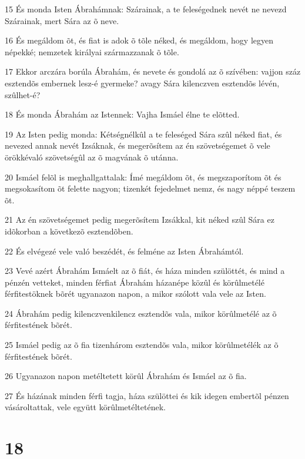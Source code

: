 \par 15 És monda Isten Ábrahámnak: Szárainak, a te feleségednek nevét ne nevezd Szárainak, mert Sára az õ neve.
\par 16 És megáldom õt, és fiat is adok õ tõle néked, és megáldom, hogy legyen népekké; nemzetek királyai származzanak õ tõle.
\par 17 Ekkor arczára borúla Ábrahám, és nevete és gondolá az õ szívében: vajjon száz esztendõs embernek lesz-é gyermeke? avagy Sára kilenczven esztendõs lévén, szûlhet-é?
\par 18 És monda Ábrahám az Istennek: Vajha Ismáel élne te elõtted.
\par 19 Az Isten pedig monda: Kétségnélkûl a te feleséged Sára szûl néked fiat, és nevezed annak nevét Izsáknak, és megerõsítem az én szövetségemet õ vele örökkévaló szövetségûl az õ magvának õ utánna.
\par 20 Ismáel felõl is meghallgattalak: Ímé megáldom õt, és megszaporítom õt és megsokasítom õt felette nagyon; tizenkét fejedelmet nemz, és nagy néppé teszem õt.
\par 21 Az én szövetségemet pedig megerõsítem Izsákkal, kit néked szûl Sára ez idõkorban a következõ esztendõben.
\par 22 És elvégezé vele való beszédét, és felméne az Isten Ábrahámtól.
\par 23 Vevé azért Ábrahám Ismáelt az õ fiát, és háza minden szülöttét, és mind a pénzén vetteket, minden férfiat Ábrahám házanépe közûl és körûlmetélé férfitestöknek bõrét ugyanazon napon, a mikor szólott vala vele az Isten.
\par 24 Ábrahám pedig kilenczvenkilencz esztendõs vala, mikor körûlmetélé az õ férfitestének bõrét.
\par 25 Ismáel pedig az õ fia tizenhárom esztendõs vala, mikor körûlmetélék az õ férfitestének bõrét.
\par 26 Ugyanazon napon metéltetett körûl Ábrahám és Ismáel az õ fia.
\par 27 És házának minden férfi tagja, háza szülöttei és kik idegen embertõl pénzen vásároltattak, vele együtt körûlmetéltetének.

\chapter{18}

